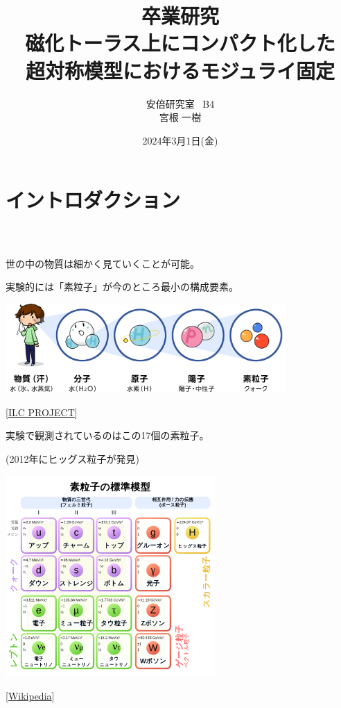 \documentclass[
  a4paper,uplatex,dvipdfmx,11pt,
  xcolor = {dvipsnames,svgnames},
  hyperref ={colorlinks=true,citecolor=Navy,linkcolor=NavyBlue,urlcolor=purple}
]{beamer}
\title{
  卒業研究
  \texorpdfstring{\\}{}
  \texorpdfstring{\vspace*{5pt}}{}
  {\LARGE
    磁化トーラス上にコンパクト化した
    \\
    超対称模型におけるモジュライ固定
  }
}
\author{
  安倍研究室 \ B4
  \texorpdfstring{\\}{}
  \texorpdfstring{\vspace*{3pt}}{}
  宮根 一樹
}
\date{2024年3月1日(金)}
\begin{document}
\begin{frame}
  \titlepage
\end{frame}


\section{イントロダクション}

\begin{frame}[plain]
  \frametitle{\ }
  \huge \secname
\end{frame}

\begin{frame}
  世の中の物質は細かく見ていくことが可能。

  実験的には「素粒子」が今のところ最小の構成要素。

  \begin{center}
    \includegraphics[width=0.8\textwidth]{fig/ILCproject.png}       

    \vspace*{-5pt}
    { \small
      \hspace*{6cm}
      [\href{https://aaa-sentan.org/ILC/about_physics/anatomy01.html}{ILC PROJECT}]
    }   
  \end{center}

\end{frame}

\begin{frame}
  
  \begin{center}

    実験で観測されているのはこの17個の素粒子。
  
    (2012年にヒッグス粒子が発見)

    \includegraphics[width=0.6\textwidth]{fig/SM.png}  

    \vspace*{-15pt}
    { \small
      \hspace*{4cm}
      [\href{https://ja.wikipedia.org/wiki/標準模型}{Wikipedia}]
    }
  \end{center}

\end{frame}
\end{document}
